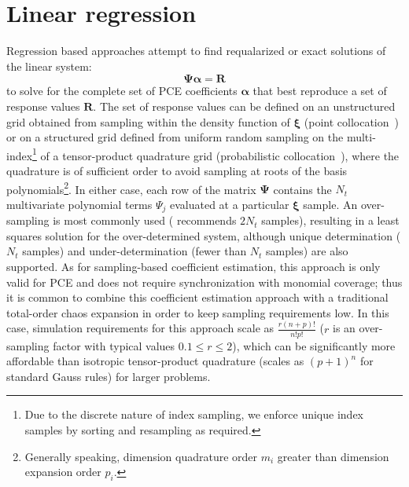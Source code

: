 \section{Linear regression} \label{uq:expansion:regress}

Regression based approaches attempt to find requalarized or exact solutions of the linear
system:
\begin{equation}
\boldsymbol{\Psi} \boldsymbol{\alpha} = \boldsymbol{R} \label{eq:regression}
\end{equation}
to solve for the complete set of PCE coefficients
$\boldsymbol{\alpha}$ that best reproduce a set of response values
$\boldsymbol{R}$.  The set of response values can be defined on an
unstructured grid obtained from sampling within the density function
of $\boldsymbol{\xi}$ (point collocation~\cite{pt_colloc1,pt_colloc2})
or on a structured grid defined from uniform random sampling on the
multi-index\footnote{Due to the discrete nature of index sampling, we
  enforce unique index samples by sorting and resampling as required.}
of a tensor-product quadrature grid (probabilistic
collocation~\cite{Tat95}), where the quadrature is of sufficient order
to avoid sampling at roots of the basis polynomials\footnote{Generally
  speaking, dimension quadrature order $m_i$ greater than dimension
  expansion order $p_i$.}.  In either case, each row of the matrix
$\boldsymbol{\Psi}$ contains the $N_t$ multivariate polynomial terms
$\Psi_j$ evaluated at a particular $\boldsymbol{\xi}$ sample.  An
over-sampling is most commonly used (\cite{pt_colloc2} recommends
$2N_t$ samples), resulting in a least squares solution for the
over-determined system, although unique determination ($N_t$ samples)
and under-determination (fewer than $N_t$ samples) are also supported.
As for sampling-based coefficient estimation, this approach is only
valid for PCE and does not require synchronization with monomial
coverage; thus it is common to combine this coefficient estimation
approach with a traditional total-order chaos expansion in order to
keep sampling requirements low.  In this case, simulation requirements
for this approach scale as $\frac{r(n+p)!}{n!p!}$ ($r$ is an
over-sampling factor with typical values $0.1 \leq r \leq 2$), which
can be significantly more affordable than isotropic tensor-product
quadrature (scales as $(p+1)^n$ for standard Gauss rules) for larger
problems.
